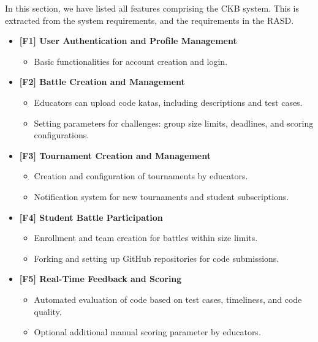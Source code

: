 In this section, we have listed all features comprising the CKB system. This is extracted from the system requirements, and the requirements in the RASD. 

\begin{itemize}
\renewcommand{\labelitemi}{}
    \item \textbf{[F1] User Authentication and Profile Management}
    \begin{itemize}
        \item Basic functionalities for account creation and login.
    \end{itemize}

    \item \textbf{[F2] Battle Creation and Management}
    \begin{itemize}
        \item Educators can upload code katas, including descriptions and test cases.
        \item Setting parameters for challenges: group size limits, deadlines, and scoring configurations.
    \end{itemize}

    \item \textbf{[F3] Tournament Creation and Management}
    \begin{itemize}
        \item Creation and configuration of tournaments by educators.
        \item Notification system for new tournaments and student subscriptions.
    \end{itemize}

    \item \textbf{[F4] Student Battle Participation }
    \begin{itemize}
        \item Enrollment and team creation for battles within size limits.
        \item Forking and setting up GitHub repositories for code submissions.
    \end{itemize}

    \item \textbf{[F5] Real-Time Feedback and Scoring}
    \begin{itemize}
        \item Automated evaluation of code based on test cases, timeliness, and code quality.
        \item Optional additional manual scoring parameter by educators.
    \end{itemize}


\end{itemize}
